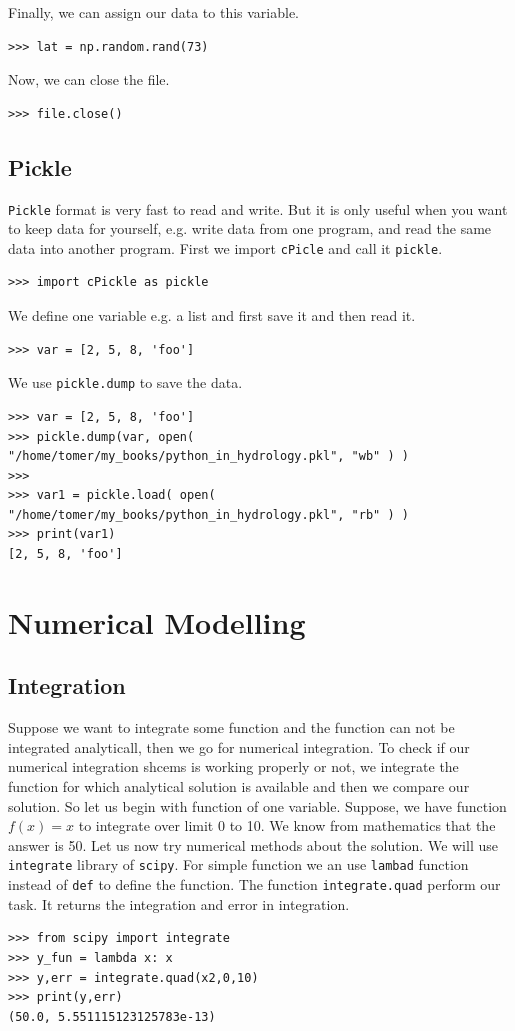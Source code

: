 \documentclass[10pt]{book}
\begin{document}
Finally, we can assign our data to this variable. 
\beforeverb \begin{verbatim}
>>> lat = np.random.rand(73)
\end{verbatim} \afterverb
Now, we can close the file.
\beforeverb \begin{verbatim}
>>> file.close()
\end{verbatim} \afterverb

\section{Pickle}
\verb"Pickle" format is very fast to read and write. But it is only useful when you want to keep data for yourself, e.g. write data from one program, and read the same data into another program. First we import \verb"cPicle" and call it \verb"pickle". 
\beforeverb \begin{verbatim}
>>> import cPickle as pickle
\end{verbatim} \afterverb

We define one variable e.g. a list and first save it and then read it.
\beforeverb \begin{verbatim}
>>> var = [2, 5, 8, 'foo']
\end{verbatim} \afterverb

We use \verb"pickle.dump" to save the data. 
\beforeverb \begin{verbatim}
>>> var = [2, 5, 8, 'foo']
>>> pickle.dump(var, open( "/home/tomer/my_books/python_in_hydrology.pkl", "wb" ) )
>>> 
>>> var1 = pickle.load( open( "/home/tomer/my_books/python_in_hydrology.pkl", "rb" ) )
>>> print(var1)
[2, 5, 8, 'foo']
\end{verbatim} \afterverb

\chapter{Numerical Modelling}

\section{Integration}
Suppose we want to integrate some function and the function can not be integrated analyticall, then we go for numerical integration. To check if our numerical integration shcems is working properly or not, we integrate the function for which analytical solution is available and then we compare our solution. So let us begin with function of one variable. Suppose, we have function $f(x) = x$ to integrate over limit 0 to 10. We know from mathematics that the answer is 50. Let us now try numerical methods about the solution. We will use \verb"integrate" library of \verb"scipy". For simple function we an use \verb"lambad" function instead of \verb"def" to define the function. The function \verb"integrate.quad" perform our task. It returns the integration and error in integration.
\beforeverb \begin{verbatim}
>>> from scipy import integrate
>>> y_fun = lambda x: x
>>> y,err = integrate.quad(x2,0,10)
>>> print(y,err)
(50.0, 5.551115123125783e-13)
\end{verbatim} \afterverb
\end{document}
